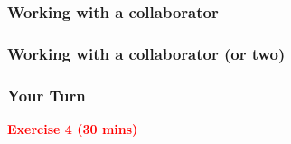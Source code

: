 \documentclass{beamer}
\begin{document}
\begin{frame}
\frametitle{Working with a collaborator}
\begin{center}
\end{center}
\end{frame}

\begin{frame}
\frametitle{Working with a collaborator (or two)}
\begin{center}
\end{center}
\end{frame}

\begin{frame}
\frametitle{Your Turn}
\begin{center}
\textbf{\textcolor{red}{Exercise 4 (30 mins)}}
\end{center}
\end{frame}
\end{document}
